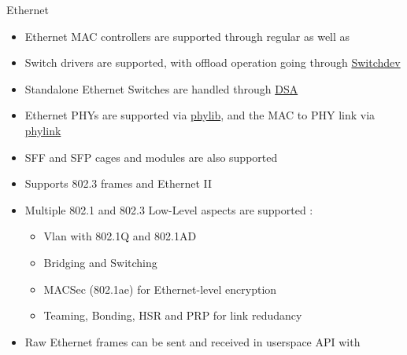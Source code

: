 \begin{frame}{Ethernet}
	\begin{itemize}
		\item Ethernet MAC controllers are supported through regular  as well as 
		\item Switch drivers are supported, with offload operation going through \href{https://docs.kernel.org/networking/switchdev.html}{Switchdev}
		\item Standalone Ethernet Switches are handled through \href{https://docs.kernel.org/networking/dsa/dsa.html}{DSA}
		\item Ethernet PHYs are supported via \href{https://docs.kernel.org/networking/phy.html}{phylib}, and the MAC to PHY link via \href{https://docs.kernel.org/networking/sfp-phylink.html}{phylink}
		\item SFF and SFP cages and modules are also supported
		\item Supports 802.3 frames and Ethernet II
		\item Multiple 802.1 and 802.3 Low-Level aspects are supported :
			\begin{itemize}
				\item Vlan with 802.1Q and 802.1AD
				\item Bridging and Switching
				\item MACSec (802.1ae) for Ethernet-level encryption
				\item Teaming, Bonding, HSR and PRP for link redudancy
			\end{itemize}
		\item Raw Ethernet frames can be sent and received in userspace API with 
	\end{itemize}
\end{frame}

